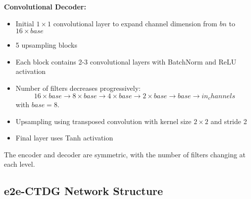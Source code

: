\textbf{Convolutional Decoder:}
\begin{itemize}
    \item Initial $1\times 1$ convolutional layer 
    to expand channel dimension from $bn$ to $16 \times base$
    \item 5 upsampling blocks
    \item Each block contains 2-3 convolutional
    layers with BatchNorm and ReLU activation
    \item Number of filters decreases progressively:
    $$ 16\times base \rightarrow 8
    \times base \rightarrow 4\times base \rightarrow
    2\times base \rightarrow base \rightarrow in_channels$$
    with $base = 8$.
    \item Upsampling using transposed convolution
     with kernel size $2\times 2$ and stride 2
    \item Final layer uses Tanh activation
\end{itemize}
The encoder and decoder are symmetric, with the number of filters changing at each level.

\subsection{e2e-CTDG Network Structure}

